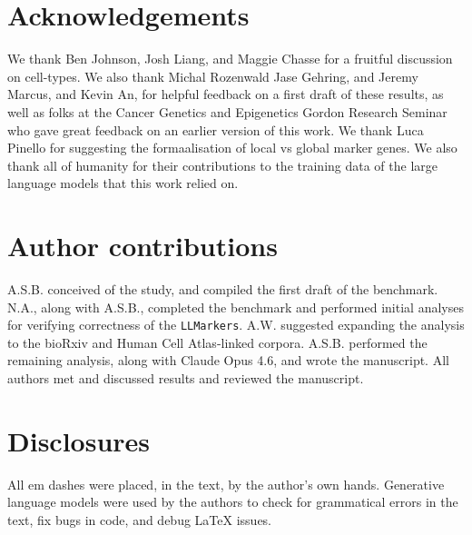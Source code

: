 \documentclass[10pt,twocolumn]{article}
\theoremstyle{plain}
\theoremstyle{definition}
\theoremstyle{remark}
\begin{document}
\section{Acknowledgements}
We thank Ben Johnson, Josh Liang, and Maggie Chasse for a fruitful discussion on cell-types. We also thank Michal Rozenwald Jase Gehring, and Jeremy Marcus, and Kevin An, for helpful feedback on a first draft of these results, as well as folks at the Cancer Genetics and Epigenetics Gordon Research Seminar who gave great feedback on an earlier version of this work. We thank Luca Pinello for suggesting the formaalisation of local vs global marker genes. We also thank all of humanity for their contributions to the training data of the large language models that this work relied on.

\section{Author contributions}
A.S.B. conceived of the study, and compiled the first draft of the benchmark. N.A., along with A.S.B., completed the benchmark and performed initial analyses for verifying correctness of the \texttt{LLMarkers}. A.W. suggested expanding the analysis to the bioRxiv and Human Cell Atlas-linked corpora. A.S.B. performed the remaining analysis, along with Claude Opus 4.6, and wrote the manuscript. All authors met and discussed results and reviewed the manuscript.

\section{Disclosures}
All em dashes were placed, in the text, by the author's own hands. Generative language models were used by the authors to check for grammatical errors in the text, fix bugs in code, and debug \LaTeX{} issues.

\newpage
\printclaimsources
\newpage


\end{document}

